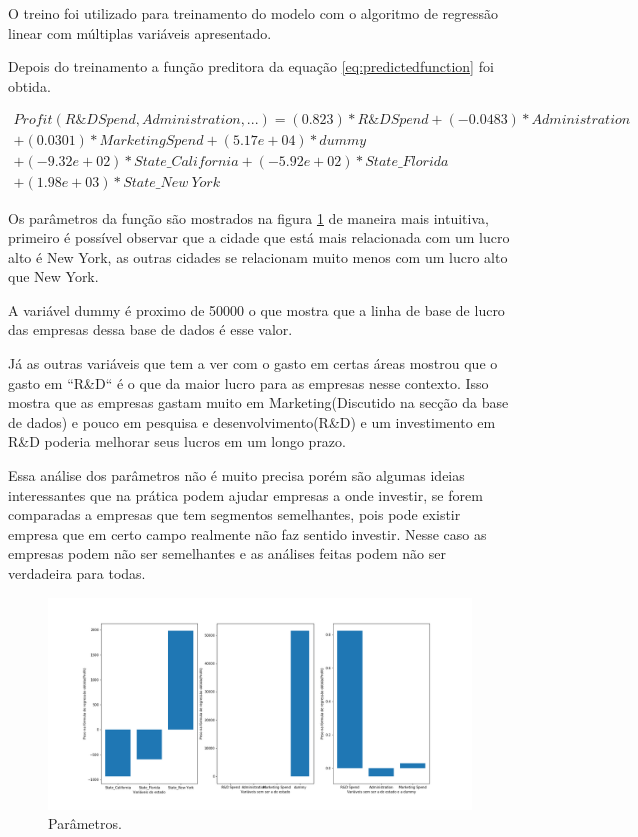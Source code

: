 \documentclass[11pt]{article}
\begin{document}
O treino foi utilizado para treinamento do modelo com o algoritmo de regressão linear com múltiplas variáveis apresentado.

Depois do treinamento a função preditora da equação \ref{eq:predictedfunction} foi obtida.

\begin{equation}\label{eq:predictedfunction}
\begin{aligned}
Profit(R\&D Spend,Administration,...) = (0.823)*R\&D Spend+(-0.0483)*Administration\\
+(0.0301)*Marketing Spend+(5.17e+04)*dummy\\
+(-9.32e+02)*State\_California+(-5.92e+02)*State\_Florida\\
+(1.98e+03)*State\_New\ York
\end{aligned}
\end{equation}

Os parâmetros da função são mostrados na figura \ref{fig:parameters} de maneira mais intuitiva, primeiro é possível observar que a cidade que está mais relacionada com um lucro alto é New York, as outras cidades se relacionam muito menos com um lucro alto que New York.

A variável dummy é proximo de 50000 o que mostra que a linha de base de lucro das empresas dessa base de dados é esse valor.

Já as outras variáveis que tem a ver com o gasto em certas áreas mostrou que o gasto em ``R\&D`` é o que da maior lucro para as empresas nesse contexto.
Isso mostra que as empresas gastam muito em Marketing(Discutido na secção da base de dados) e pouco em pesquisa e desenvolvimento(R\&D) e um investimento em R\&D poderia melhorar seus lucros em um longo prazo.

Essa análise dos parâmetros não é muito precisa porém são algumas ideias interessantes que na prática podem ajudar empresas a onde investir, se forem comparadas a empresas que tem segmentos semelhantes, pois pode existir empresa que em certo campo realmente não faz sentido investir. Nesse caso as empresas podem não ser semelhantes e as análises feitas podem não ser verdadeira para todas.

\begin{figure}[htbp]
\centering
\includegraphics[width=.9\linewidth]{./cities_parameters.png}
\caption{\label{fig:parameters}
Parâmetros.}
\end{figure}
\end{document}
